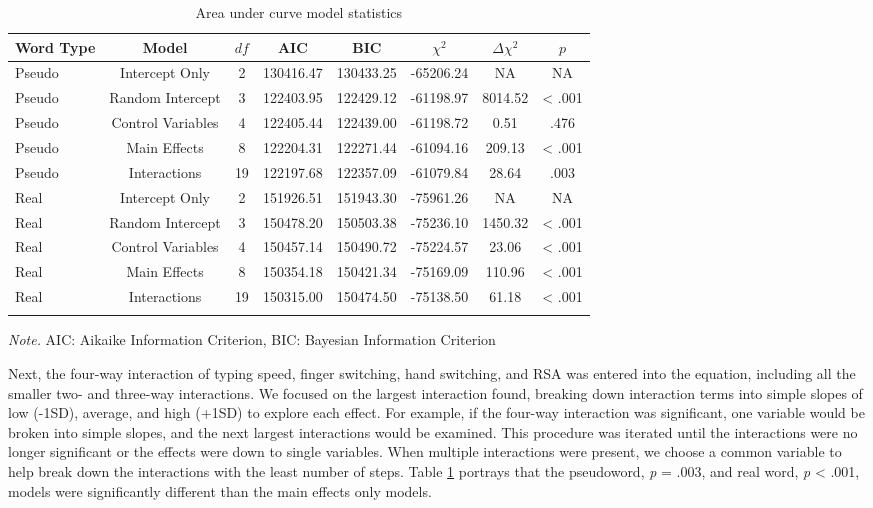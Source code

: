 \documentclass[english,man]{apa6}
\theoremstyle{definition}
\theoremstyle{definition}
\theoremstyle{definition}
\theoremstyle{remark}
\begin{document}
\begin{table}[tbp]
\begin{center}
\begin{threeparttable}
\caption{\label{tab:model-table1}Area under curve model statistics}
\begin{tabular}{lccccccc}
\toprule
Word Type & Model & $df$ & AIC & BIC & $\chi^2$ & $\Delta\chi^2$ & $p$\\
\midrule
Pseudo & Intercept Only & 2 & 130416.47 & 130433.25 & -65206.24 & NA & NA\\
Pseudo & Random Intercept & 3 & 122403.95 & 122429.12 & -61198.97 & 8014.52 & < .001\\
Pseudo & Control Variables & 4 & 122405.44 & 122439.00 & -61198.72 & 0.51 & .476\\
Pseudo & Main Effects & 8 & 122204.31 & 122271.44 & -61094.16 & 209.13 & < .001\\
Pseudo & Interactions & 19 & 122197.68 & 122357.09 & -61079.84 & 28.64 & .003\\
Real & Intercept Only & 2 & 151926.51 & 151943.30 & -75961.26 & NA & NA\\
Real & Random Intercept & 3 & 150478.20 & 150503.38 & -75236.10 & 1450.32 & < .001\\
Real & Control Variables & 4 & 150457.14 & 150490.72 & -75224.57 & 23.06 & < .001\\
Real & Main Effects & 8 & 150354.18 & 150421.34 & -75169.09 & 110.96 & < .001\\
Real & Interactions & 19 & 150315.00 & 150474.50 & -75138.50 & 61.18 & < .001\\
\bottomrule
\addlinespace
\end{tabular}
\begin{tablenotes}[para]
\textit{Note.} AIC: Aikaike Information Criterion, BIC: Bayesian Information Criterion
\end{tablenotes}
\end{threeparttable}
\end{center}
\end{table}

Next, the four-way interaction of typing speed, finger switching, hand
switching, and RSA was entered into the equation, including all the
smaller two- and three-way interactions. We focused on the largest
interaction found, breaking down interaction terms into simple slopes of
low (-1SD), average, and high (+1SD) to explore each effect. For
example, if the four-way interaction was significant, one variable would
be broken into simple slopes, and the next largest interactions would be
examined. This procedure was iterated until the interactions were no
longer significant or the effects were down to single variables. When
multiple interactions were present, we choose a common variable to help
break down the interactions with the least number of steps. Table
\ref{tab:model-table1} portrays that the pseudoword, \emph{p} = .003,
and real word, \emph{p} \textless{} .001, models were significantly
different than the main effects only models.
\end{document}
